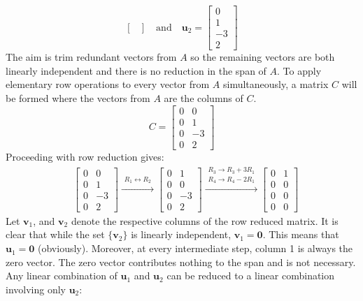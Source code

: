 \documentclass{article}
\begin{document}
\begin{itemize}
\[\begin{bmatrix}
\end{bmatrix} \quad\text{and}\quad \mathbf{u}_2 =\begin{bmatrix} 
0 \\ 1 \\ -3 \\ 2 
\end{bmatrix}\] 
The aim is trim redundant vectors from \(A\) so the remaining vectors are both linearly independent and there is no reduction in the span of \(A\). To apply elementary row operations to every vector from \(A\) simultaneously, a matrix \(C\) will be formed where the vectors from \(A\) are the columns of \(C\).
\[C = \begin{bmatrix}
0 &  0 \\
0 &  1 \\
0 & -3 \\ 
0 &  2
\end{bmatrix}\]
Proceeding with row reduction gives:
\begin{align*}
& \begin{bmatrix}
0 &  0 \\
0 &  1 \\
0 & -3 \\ 
0 &  2
\end{bmatrix} \xrightarrow{\begin{array}{c} R_1 \leftrightarrow R_2 \end{array}} \begin{bmatrix}
0 &  1 \\
0 &  0 \\
0 & -3 \\ 
0 &  2
\end{bmatrix} \xrightarrow{\begin{array}{c} R_3 \rightarrow R_3 + 3R_1 \\ R_4 \rightarrow R_4 - 2R_1 \end{array}} \begin{bmatrix}
0 & 1 \\
0 & 0 \\
0 & 0 \\ 
0 & 0
\end{bmatrix}
\end{align*}
Let \(\mathbf{v}_1\), and \(\mathbf{v}_2\) denote the respective columns of the row reduced matrix. It is clear that while the set \(\{\mathbf{v}_2\}\) is linearly independent, \(\mathbf{v}_1 = \mathbf{0}\). This means that \(\mathbf{u}_1 = \mathbf{0}\) (obviously). Moreover, at every intermediate step, column 1 is always the zero vector. The zero vector contributes nothing to the span and is not necessary. Any linear combination of \(\mathbf{u}_1\) and \(\mathbf{u}_2\) can be reduced to a linear combination involving only \(\mathbf{u}_2\):


\end{itemize}
\end{document}
